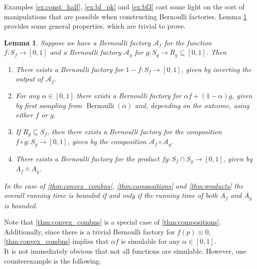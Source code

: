 \documentclass{article}
\newtheorem{lemma}{Lemma}
\theoremstyle{definition}
\newcommand{\Bern}{\operatorname{Bernoulli}}
\newcommand{\A}{\mathcal{A}}
\begin{document}
Examples \ref{ex:const_half}, \ref{ex:bf_pk} and \ref{ex:bf3} cast some light on the sort of manipulations that are possible when constructing Bernoulli factories. Lemma \ref{thm:products_compositions} provides some general properties, which are trivial to prove.

\begin{lemma}\label{thm:products_compositions}
Suppose we have a Bernoulli factory $\A_f$ for the function $f:S_f\to[0,1]$ and a Bernoulli factory $\A_g$ for $g:S_g\to R_g\subseteq[0,1]$. Then
\begin{enumerate}[label=(\alph*)]
\item There exists a Bernoulli factory for $1-f: S_f \to [0,1]$, given by inverting the output of $\A_f$.
\item \label{thm:convex_combns} For any $\alpha \in [0,1]$ there exists a Bernoulli factory for $\alpha f + (1-\alpha) g$, given by first sampling from $\Bern(\alpha)$ and, depending on the outcome, using either $f$ or $g$.
\item \label{thm:compositions} If $R_g \subseteq S_f$, then there exists a Bernoulli factory for the composition $f\circ g: S_g \to [0,1]$, given by the composition $\A_f \circ \A_g$.
\item \label{thm:products} There exists a Bernoulli factory for the product $fg:S_f \cap S_g \to [0,1]$, given by $A_f \wedge A_g$.
\end{enumerate}
In the case of \ref{thm:convex_combns}, \ref{thm:compositions} and \ref{thm:products} the overall running time is bounded if and only if the running time of both $A_f$ and $A_g$ is bounded.
\end{lemma}
Note that \ref{thm:convex_combns} is a special case of \ref{thm:compositions}.
Additionally, since there is a trivial Bernoulli factory for $f(p)\equiv 0$, \ref{thm:convex_combns} implies that $\alpha f$ is simulable for any $\alpha\in[0,1]$.\\

It is not immediately obvious that not all functions are simulable. However, one counterexample is the following.
\end{document}
